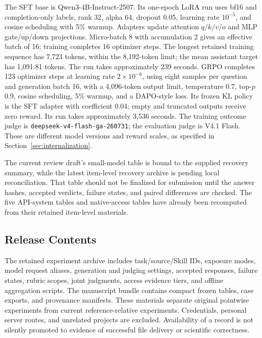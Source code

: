 The SFT base is Qwen3-4B-Instruct-2507. Its one-epoch LoRA run uses bf16 and
completion-only labels, rank 32, alpha 64, dropout 0.05, learning rate $10^{-5}$,
and cosine scheduling with 5\% warmup. Adapters update attention $q/k/v/o$
and MLP gate/up/down projections. Micro-batch 8 with accumulation 2 gives an
effective batch of 16; training completes 16 optimizer steps.
The longest retained training sequence has 7,723 tokens,
within the 8,192-token limit; the mean assistant target has 1,091.81 tokens.
The run takes approximately 239 seconds. GRPO completes 123 optimizer steps
at learning rate $2\times10^{-6}$, using eight samples per question and
generation batch 16, with a 4,096-token output limit, temperature 0.7,
top-$p$ 0.9, cosine scheduling, 5\% warmup, and a DAPO-style loss. Its frozen
KL policy is the SFT adapter with coefficient 0.04; empty and truncated outputs
receive zero reward. Its run takes approximately 3,536 seconds.
The training outcome judge is \texttt{deepseek-v4-flash-ga-260731}; the
evaluation judge is V4.1 Flash. These are different model versions and reward
scales, as specified in Section~\ref{sec:internalization}.

The current review draft's small-model table is bound to the supplied recovery
summary, while the latest item-level recovery archive is pending local
reconciliation. That table should not be finalized for submission until the
answer hashes, accepted verdicts, failure states, and paired differences are
checked. The five API-system tables and native-access tables have already been
recomputed from their retained item-level materials.

\subsection{Release Contents}

The retained experiment archive includes task/source/Skill IDs, exposure modes,
model request aliases, generation and judging settings, accepted responses,
failure states, rubric scopes, joint judgments, access evidence tiers, and
offline aggregation scripts. The manuscript bundle contains compact frozen
tables, case exports, and provenance manifests. These materials separate original pointwise experiments from
current reference-relative experiments. Credentials, personal server routes,
and unrelated projects are excluded. Availability of a record is not silently
promoted to evidence of successful file delivery or scientific correctness.
